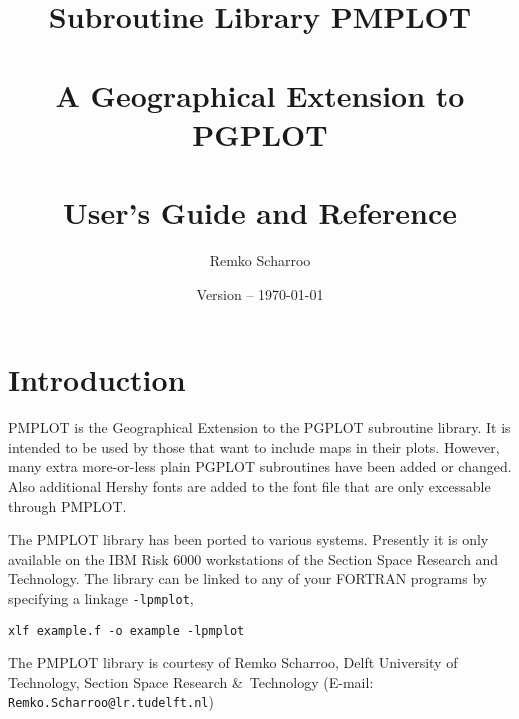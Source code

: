 \documentclass[titlepage,a4paper]{article}
\title{Subroutine Library PMPLOT \\ ~ \\
A Geographical Extension to PGPLOT \\ ~ \\
User's Guide and Reference}
\author{Remko Scharroo}
\date{Version  -- \today}
\begin{document}
\maketitle
{}
\tableofcontents
\clearpage

\section{Introduction}
PMPLOT is the Geographical Extension to the PGPLOT subroutine library. 
It is intended to be used by those that want to include maps in their
plots. However, many extra more-or-less plain PGPLOT subroutines have
been added or changed. Also additional Hershy fonts are added to the
font file that are only excessable through PMPLOT.

The PMPLOT library has been ported to various systems. Presently it is
only available on the IBM Risk 6000 workstations of the Section Space
Research and Technology. The library can be linked to any of your
FORTRAN programs by specifying a linkage \verb|-lpmplot|, \eg
\begin{verbatim}
xlf example.f -o example -lpmplot
\end{verbatim}

The PMPLOT library is courtesy of Remko Scharroo, Delft University of
Technology, Section Space Research \&\ Technology
(E-mail: \verb|Remko.Scharroo@lr.tudelft.nl|)
\end{document}
